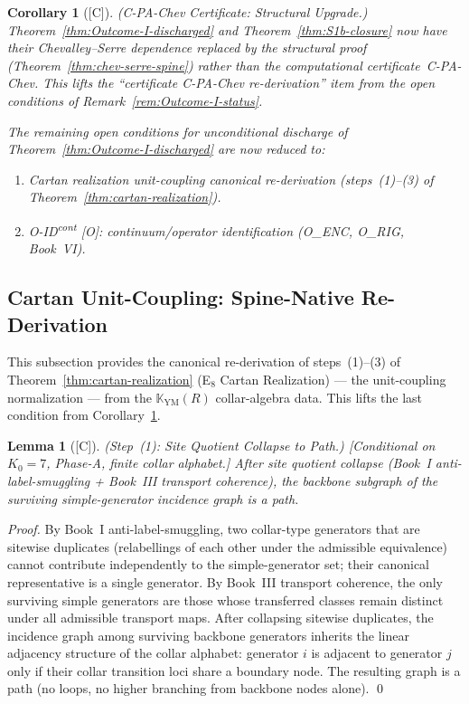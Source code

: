 \documentclass[12pt,oneside]{amsbook}
\theoremstyle{plain}
\newtheorem{lemma}[theorem]{Lemma}
\newtheorem{corollary}[theorem]{Corollary}
\theoremstyle{definition}
\theoremstyle{remark}
\newcommand{\status}[1]{\textup{[#1]}}
\begin{document}
\begin{corollary}[\status{C}]\label{cor:c-pa-chev-cert}
\textup{(C-PA-Chev Certificate: Structural Upgrade.)}
Theorem~\ref{thm:Outcome-I-discharged} and
Theorem~\ref{thm:S1b-closure} now have their Chevalley--Serre
dependence replaced by the structural proof
(Theorem~\ref{thm:chev-serre-spine}) rather than the
computational certificate~C-PA-Chev. This lifts the
``certificate C-PA-Chev re-derivation'' item from the open
conditions of Remark~\ref{rem:Outcome-I-status}.

The remaining open conditions for unconditional discharge of
Theorem~\ref{thm:Outcome-I-discharged} are now reduced to:
\begin{enumerate}[label=\textup{(\arabic*)}]
 \item Cartan realization unit-coupling canonical re-derivation
 (steps~(1)--(3) of Theorem~\ref{thm:cartan-realization}).
 \item O-ID\textsuperscript{cont} [O]: continuum/operator
 identification (O\_ENC, O\_RIG, Book~VI).
\end{enumerate}
\end{corollary}

\subsection{Cartan Unit-Coupling: Spine-Native Re-Derivation}

This subsection provides the canonical re-derivation of
steps~(1)--(3) of Theorem~\ref{thm:cartan-realization}
(E$_8$ Cartan Realization) --- the unit-coupling normalization
--- from the $\mathbb{K}_{\mathrm{YM}}(R)$ collar-algebra data.
This lifts the last condition from
Corollary~\ref{cor:c-pa-chev-cert}.

\begin{lemma}[\status{C}]\label{lem:site-quotient-collapse}
\textup{(Step~(1): Site Quotient Collapse to Path.)}
\textup{[Conditional on $K_0=7$, Phase-A, finite collar alphabet.]}
After site quotient collapse (Book~I anti-label-smuggling +
Book~III transport coherence), the backbone subgraph of the
surviving simple-generator incidence graph is a path.
\end{lemma}

\begin{proof}
By Book~I anti-label-smuggling, two collar-type generators
that are sitewise duplicates (relabellings of each other
under the admissible equivalence) cannot contribute
independently to the simple-generator set; their canonical
representative is a single generator. By Book~III transport
coherence, the only surviving simple generators are those
whose transferred classes remain distinct under all admissible
transport maps. After collapsing sitewise duplicates, the
incidence graph among surviving backbone generators inherits
the linear adjacency structure of the collar alphabet:
generator $i$ is adjacent to generator $j$ only if their
collar transition loci share a boundary node. The resulting
graph is a path (no loops, no higher branching from backbone
nodes alone). \qed
\end{proof}
\end{document}
